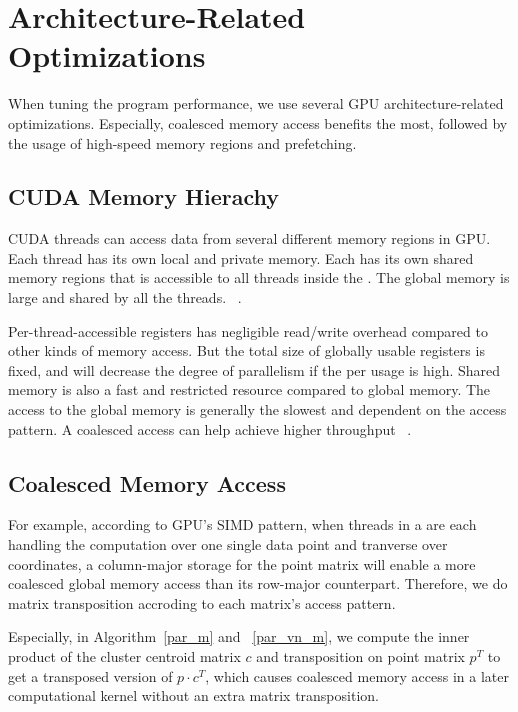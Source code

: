 \section{Architecture-Related Optimizations}
\label{s:optimization}

When tuning the program performance, we use several
GPU architecture-related optimizations. Especially, coalesced memory access 
benefits the most, followed by the usage of high-speed memory regions and
prefetching.

\subsection{CUDA Memory Hierachy}

CUDA threads can access data from several different memory regions in GPU. Each 
thread has its own local and private memory. Each \TB has its own shared
memory regions that is accessible to all threads inside the \TB. The
global memory is large and shared by all the threads. ~\cite{cuda-program-guide}.

Per-thread-accessible registers has negligible read/write overhead compared to 
other kinds of memory access. But the total size of globally usable registers is 
fixed, and will decrease the degree of parallelism if the per \TB usage is high.
Shared memory is also a fast and restricted resource compared to global memory.
The access to the global memory is generally the slowest and dependent on the 
access pattern. A coalesced access can help achieve higher throughput
~\cite{kepler-tuning}. 

\subsection{Coalesced Memory Access}

For example, according to GPU's SIMD pattern, when threads in a \TB are each 
handling the computation over one single data point and tranverse over coordinates,
a column-major storage for the point matrix will enable a more coalesced global
memory access than its row-major counterpart. Therefore, we do matrix transposition
accroding to each matrix's access pattern.

Especially, in Algorithm~\ref{par_m} and ~\ref{par_vn_m}, we compute the inner 
product of the cluster centroid matrix $c$ and transposition on point matrix
$p^T$ to get a transposed version of $p \cdot c^T$, which causes coalesced memory
access in a later computational kernel without an extra matrix transposition.


